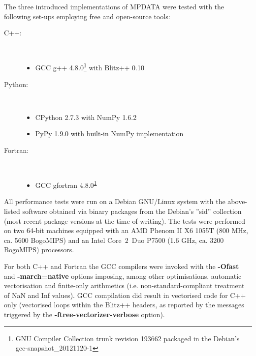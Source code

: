 \documentclass[final,5p,times,twocolumn]{elsarticle}
\newcommand{\prog}[1]{{\rm\bf#1}}
\begin{document}
  The three introduced implementations of MPDATA were tested with the following set-ups 
    employing free and open-source tools:
  \begin{description}
    \item[C++:]{~
      \begin{itemize}
        \item{GCC g++ 4.8.0\footnote{\label{fnt:gcc-snapshot}GNU Compiler Collection trunk revision 193662 packaged in the Debian's gcc-snapshot\_20121120-1}
          with Blitz++ 0.10}
      \end{itemize}
    }
    \item[Python:]{~
      \begin{itemize}
        \item{CPython 2.7.3 with NumPy 1.6.2}
        \item{PyPy 1.9.0 with built-in NumPy implementation}
      \end{itemize}
    }
    \item[Fortran:]{~
      \begin{itemize}
        \item{GCC gfortran 4.8.0\textsuperscript{\ref{fnt:gcc-snapshot}}}
      \end{itemize}
    }
  \end{description}
  All performance tests were run on a Debian GNU/Linux system with the above-listed software obtained 
    via binary packages from the Debian's ''sid'' collection (most recent package versions at the time of writing).
  The tests were performed on two 64-bit machines equipped with
    an AMD Phenom\textsuperscript{\texttrademark} II X6 1055T (800 MHz, ca. 5600 BogoMIPS)
    and an Intel\textsuperscript{\textregistered} Core\textsuperscript{\texttrademark}~2~Duo P7500 (1.6 GHz, ca. 3200 BogoMIPS)
    processors.

  For both C++ and Fortran the GCC compilers were invoked with the \prog{-Ofast} and \prog{-march=native} 
    options imposing, among other optimisations, automatic vectorisation and finite-only arithmetics 
    (i.e.  non-standard-compliant treatment of NaN and Inf values).
  GCC compilation did result in vectorised code for C++ only (vectorised loops within the Blitz++ headers, 
    as reported by the messages triggered by the \prog{-ftree-vectorizer-verbose} option).
\end{document}
